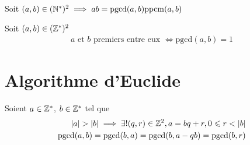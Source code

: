 \begin{theoreme}
Soit $(a, b) \in (\mathbb{N}^*)^2 \implies ab = \mathrm{pgcd}(a, b)\mathrm{ppcm}(a, b)$
\end{theoreme}

\begin{definition}
	Soit $(a, b) \in (\mathbb{Z}^*)^2$
	\begin{align*}
	a \text{ et } b \text{ premiers entre eux } \iff \mathrm{pgcd}(a, b) = 1
	\end{align*}
\end{definition}

\section{Algorithme d'Euclide}
\begin{proposition}
Soient $a \in \mathbb{Z}^*$, $b \in \mathbb{Z}^*$ tel que 
\begin{align*}
|a| > |b| \implies \exists ! (q, r) \in \mathbb{Z}^2, a = b q + r, 0 \leqslant r < |b| \\
\mathrm{pgcd}(a, b) = \mathrm{pgcd}(b, a) = \mathrm{pgcd}(b, a - qb) = \mathrm{pgcd}(b, r)
\end{align*}

\end{proposition}
